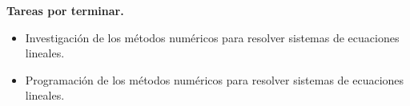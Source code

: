 \documentclass[12pt]{report}
\numberwithin{equation}{section}
\begin{document}
\begin{flushleft}
\small{\textbf{Tareas por terminar.}\\

\begin{itemize}
\item Investigaci\'on de los métodos numéricos para resolver sistemas de ecuaciones lineales.
\item Programaci\'on de los m\'etodos num\'ericos para resolver sistemas de ecuaciones lineales.
\end{itemize}}



\end{flushleft}
\end{document}
